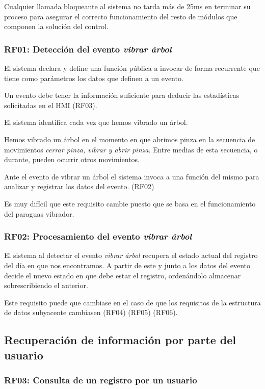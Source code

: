 Cualquier llamada bloqueante al sistema no tarda más de 25ms
en terminar su proceso para asegurar el correcto funcionamiento del
resto de módulos que componen la solución del control.

\subsubsection{RF01: Detección del evento \textit{vibrar árbol}}

El sistema declara y define una función pública a invocar
de forma recurrente que tiene como parámetros los datos que definen
a un evento.

Un evento debe tener la información suficiente para deducir
las estadísticas solicitadas en el HMI (RF03).

El sistema identifica cada vez que hemos vibrado un árbol.

Hemos vibrado un árbol en el momento en que abrimos pinza en
la secuencia de movimientos \textit{cerrar pinza, vibrar y abrir pinza}.
Entre medias de esta secuencia, o durante, pueden ocurrir otros
movimientos.

Ante el evento de vibrar un árbol el sistema invoca a una función
del mismo para analizar y registrar los datos del evento. (RF02)

Es muy difícil que este requisito cambie puesto que se basa en el
funcionamiento del paraguas vibrador.

\subsubsection{RF02: Procesamiento del evento \textit{vibrar árbol}}

El sistema al detectar el evento \textit{vibrar árbol} recupera
el estado actual del registro del día en que nos encontramos.
A partir de este y junto a los datos del evento decide el nuevo
estado en que debe estar el registro, ordenándolo almacenar
sobrescribiendo el anterior.

Este requisito puede que cambiase en el caso de que los requisitos
de la estructura de datos subyacente cambiasen (RF04) (RF05) (RF06).

\subsection{Recuperación de información por parte del usuario}

\subsubsection{RF03: Consulta de un registro por un usuario}

